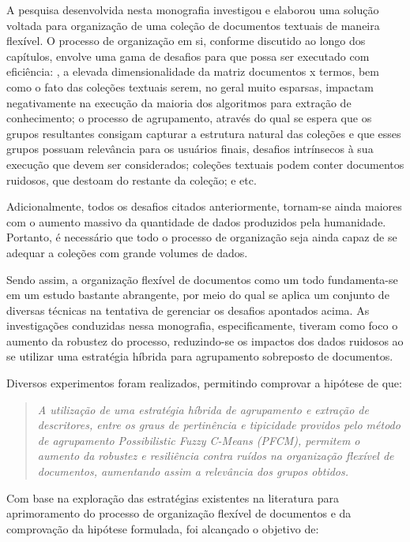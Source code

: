 A pesquisa desenvolvida nesta monografia investigou e elaborou uma solução voltada para organização de uma coleção de documentos textuais de maneira flexível. O processo de organização em si, conforme
discutido ao longo dos capítulos, envolve uma gama de desafios para que possa ser executado com eficiência: ,
a elevada dimensionalidade da matriz documentos x termos, bem como o fato das coleções textuais serem, no geral muito esparsas, impactam negativamente na execução da maioria dos algoritmos para extração de conhecimento; o processo de agrupamento, através do qual se espera que os grupos resultantes consigam capturar a estrutura natural das coleções e que esses
grupos possuam relevância para os usuários finais, desafios intrínsecos à sua execução que devem ser considerados; coleções textuais podem conter documentos ruidosos, que destoam do restante da coleção; e etc.

Adicionalmente, todos os desafios citados anteriormente, tornam-se ainda maiores com o aumento massivo da quantidade de dados produzidos pela humanidade. Portanto, é necessário que todo o processo de organização seja ainda capaz de se adequar a coleções com grande volumes de dados.

Sendo assim, a organização flexível de documentos como um todo fundamenta-se em um estudo bastante
abrangente, por meio do qual se aplica um conjunto de diversas técnicas na tentativa de gerenciar os desafios apontados acima.
As investigações conduzidas nessa monografia, especificamente, tiveram como foco o aumento da
robustez do processo, reduzindo-se os impactos dos dados ruidosos ao se utilizar uma estratégia
híbrida para agrupamento sobreposto de documentos.

Diversos experimentos foram realizados, permitindo comprovar a hipótese de que:

\begin{quote}
\textit{A utilização de uma estratégia híbrida de agrupamento e extração de descritores, entre os 
  graus de pertinência e tipicidade providos pelo método de agrupamento {\it Possibilistic Fuzzy C-Means} (PFCM), permitem o aumento da
    robustez e resiliência contra ruídos na organização flexível de documentos, aumentando assim a
    relevância dos grupos obtidos.}
\end{quote}

Com base na exploração das estratégias existentes na literatura para aprimoramento do
processo de organização flexível de documentos e da comprovação da hipótese formulada, foi alcançado o objetivo
de:

